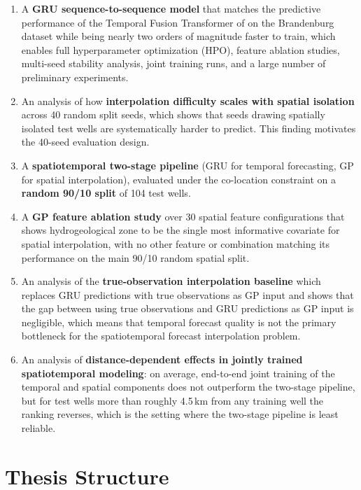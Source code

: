 \begin{enumerate}
  \item A \textbf{GRU sequence-to-sequence model} that matches the predictive performance of the
  Temporal Fusion Transformer of \citet{kunz2025} on the Brandenburg dataset while being nearly two
  orders of magnitude faster to train, which enables full hyperparameter optimization (HPO),
  feature ablation studies, multi-seed stability analysis, joint training runs, and a large
  number of preliminary experiments.

  \item An analysis of how \textbf{interpolation difficulty scales with spatial isolation}
  across 40 random split seeds, which shows that seeds drawing spatially isolated test wells
  are systematically harder to predict. This finding motivates the 40-seed evaluation design.

  \item A \textbf{spatiotemporal two-stage pipeline} (GRU for temporal forecasting, GP for
  spatial interpolation), evaluated under the co-location constraint on a \textbf{random 90/10
  split} of 104 test wells.

  \item A \textbf{GP feature ablation study} over 30 spatial feature configurations that
  shows hydrogeological zone to be the single most informative covariate for spatial
  interpolation, with no other feature or combination matching its performance on the main 90/10 random spatial split.

  \item An analysis of the \textbf{true-observation interpolation baseline} which replaces GRU predictions with
  true observations as GP input and shows that the gap between using
  true observations and GRU predictions as GP input is negligible, which means that temporal
  forecast quality is not the primary bottleneck for the spatiotemporal forecast interpolation problem.

  \item An analysis of \textbf{distance-dependent effects in jointly trained spatiotemporal
  modeling}: on average, end-to-end joint training of the temporal and spatial components does not outperform the two-stage pipeline,
  but for test wells more than roughly 4.5\,km from any training well the ranking reverses,
  which is the setting where the two-stage pipeline is least reliable.
\end{enumerate}

\section{Thesis Structure}
\label{sec:structure}

